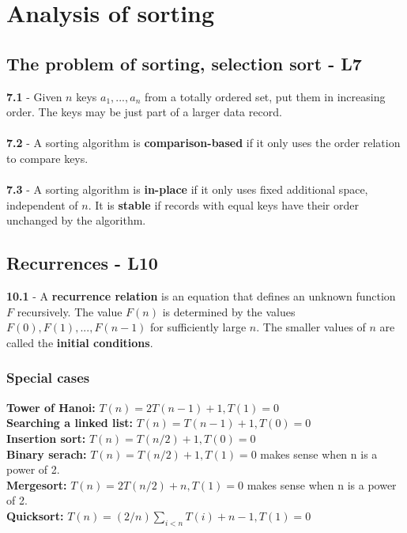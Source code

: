 \documentclass[a4paper]{article}
\begin{document}
\section{Analysis of sorting}
\subsection*{The problem of sorting, selection sort - L7}
\textbf{7.1} - Given $n$ keys $a_1,...,a_n$ from a totally ordered set, put them in increasing
order. The keys may be just part of a larger data record.\\\\
\textbf{7.2} - A sorting algorithm is \textbf{comparison-based} if it only uses the order
relation to compare keys.\\\\
\textbf{7.3} - A sorting algorithm is \textbf{in-place} if it only uses fixed additional space,
independent of $n$. It is \textbf{stable} if records with equal keys have their order unchanged
by the algorithm.

\subsection*{Recurrences - L10}
\textbf{10.1} - A \textbf{recurrence relation} is an equation that
defines an unknown function $F$ recursively. The value $F(n)$ is determined by the
values $F(0), F(1),..., F(n - 1)$ for sufficiently large $n$. The smaller values of $n$ are
called the \textbf{initial conditions}.
\subsubsection*{Special cases}
\textbf{Tower of Hanoi:} $T(n) = 2T(n - 1) + 1, T(1) = 0$\\
\textbf{Searching a linked list:} $T(n) = T(n-1)+1, T(0) =0$\\
\textbf{Insertion sort:} $T(n)=T(n/2)+1,T(0)=0$\\
\textbf{Binary serach:} $T(n)=T(n/2) +1, T(1)=0$ makes sense when n is a power of 2.\\
\textbf{Mergesort:} $T(n)=2T(n/2)+n, T(1)=0$ makes sense when n is a power of 2.\\
\textbf{Quicksort:} $T(n)=(2/n)\sum_{i<n}T(i)+n-1, T(1)=0$
\end{document}
